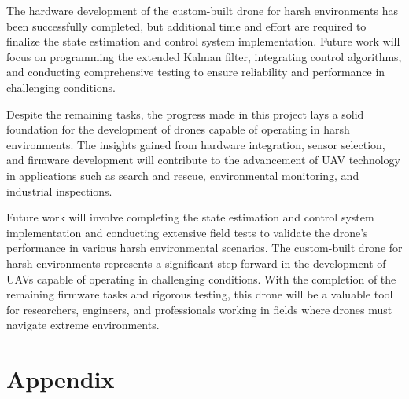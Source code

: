 \documentclass{article}
\begin{document}
The hardware development of the custom-built drone for harsh environments has been successfully completed, but additional time and effort are required to finalize the state estimation and control system implementation. Future work will focus on programming the extended Kalman filter, integrating control algorithms, and conducting comprehensive testing to ensure reliability and performance in challenging conditions.

Despite the remaining tasks, the progress made in this project lays a solid foundation for the development of drones capable of operating in harsh environments. The insights gained from hardware integration, sensor selection, and firmware development will contribute to the advancement of UAV technology in applications such as search and rescue, environmental monitoring, and industrial inspections.

Future work will involve completing the state estimation and control system implementation and conducting extensive field tests to validate the drone's performance in various harsh environmental scenarios. The custom-built drone for harsh environments represents a significant step forward in the development of UAVs capable of operating in challenging conditions. With the completion of the remaining firmware tasks and rigorous testing, this drone will be a valuable tool for researchers, engineers, and professionals working in fields where drones must navigate extreme environments.

\section{Appendix}
\end{document}
